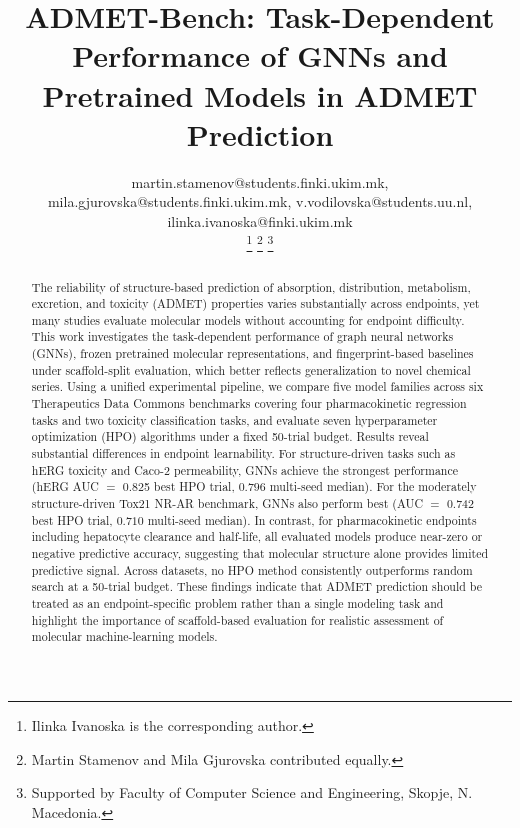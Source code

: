 \documentclass[journal]{IEEEtran}
\begin{document}
\title{ADMET-Bench: Task-Dependent Performance of GNNs and Pretrained Models in ADMET Prediction}

\author{



martin.stamenov@students.finki.ukim.mk, mila.gjurovska@students.finki.ukim.mk, v.vodilovska@students.uu.nl, ilinka.ivanoska@finki.ukim.mk

\thanks{Ilinka Ivanoska is the corresponding author.}
\thanks{Martin Stamenov and Mila Gjurovska contributed equally.}
\thanks{Supported by Faculty of Computer Science and Engineering, Skopje, N. Macedonia.}
}

\maketitle

\begin{abstract}
The reliability of structure-based prediction of absorption, distribution, metabolism, excretion, and toxicity (ADMET) properties varies substantially across endpoints, yet many studies evaluate molecular models without accounting for endpoint difficulty. This work investigates the task-dependent performance of graph neural networks (GNNs), frozen pretrained molecular representations, and fingerprint-based baselines under scaffold-split evaluation, which better reflects generalization to novel chemical series. Using a unified experimental pipeline, we compare five model families across six Therapeutics Data Commons benchmarks covering four pharmacokinetic regression tasks and two toxicity classification tasks, and evaluate seven hyperparameter optimization (HPO) algorithms under a fixed 50-trial budget. Results reveal substantial differences in endpoint learnability. For structure-driven tasks such as hERG toxicity and Caco-2 permeability, GNNs achieve the strongest performance (hERG AUC $=$ 0.825 best HPO trial, $0.796$ multi-seed median). For the moderately structure-driven Tox21 NR-AR benchmark, GNNs also perform best (AUC $=$ 0.742 best HPO trial, $0.710$ multi-seed median). In contrast, for pharmacokinetic endpoints including hepatocyte clearance and half-life, all evaluated models produce near-zero or negative predictive accuracy, suggesting that molecular structure alone provides limited predictive signal. Across datasets, no HPO method consistently outperforms random search at a 50-trial budget. These findings indicate that ADMET prediction should be treated as an endpoint-specific problem rather than a single modeling task and highlight the importance of scaffold-based evaluation for realistic assessment of molecular machine-learning models.
\end{abstract}
\end{document}
